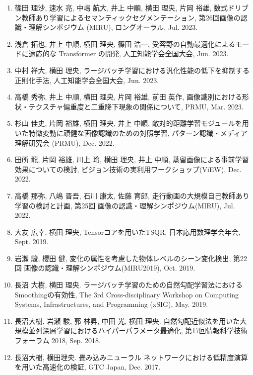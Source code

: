 \documentclass[margin,line]{cv}
\begin{document}
\begin{resume}
\begin{enumerate}
\item 篠田 理沙, 速水 亮, 中嶋 航大, 井上 中順, 横田 理央, 片岡 裕雄,  数式ドリブン教師あり学習によるセマンティックセグメンテーション, 第26回画像の認識・理解シンポジウム (MIRU), ロングオーラル, Jul. 2023.

\item 浅倉 拓也, 井上 中順, 横田 理央, 篠田 浩一, 受容野の自動最適化によるモードに適応的な Transformer の開発, 人工知能学会全国大会, Jun. 2023.

\item 中村 祥大, 横田 理央, ラージバッチ学習における汎化性能の低下を抑制する正則化手法, 人工知能学会全国大会, Jun. 2023.

\item 高橋 秀弥, 井上 中順, 横田 理央, 片岡 裕雄, 前田 英作, 画像識別における形状・テクスチャ偏重度と二重降下現象の関係について, PRMU, Mar. 2023.

\item 杉山 佳史, 片岡 裕雄, 横田 理央, 井上 中順, 敵対的距離学習モジュールを用いた特徴変動に頑健な画像認識のための対照学習, パターン認識・メディア理解研究会 (PRMU), Dec. 2022.

\item 田所 龍, 片岡 裕雄, 川上 玲, 横田 理央, 井上 中順, 蒸留画像による事前学習効果についての検討, ビジョン技術の実利用ワークショップ(ViEW), Dec. 2022.

\item 高橋 那弥, 八嶋 晋吾, 石川 康太, 佐藤 育郎, 走行動画の大規模自己教師あり学習の検討と計画, 第25回 画像の認識・理解シンポジウム(MIRU), Jul. 2022.

\item 大友 広幸, 横田 理央, Tensorコアを用いたTSQR, 日本応用数理学会年会, Sept. 2019.

\item 岩瀬 駿, 櫻田 健, 変化の属性を考慮した物体レベルのシーン変化検出, 第22回 画像の認識・理解シンポジウム(MIRU2019), Oct. 2019.

\item 長沼 大樹, 横田 理央. ラージバッチ学習のための自然勾配学習法におけるSmoothingの有効性, The 3rd Cross-disciplinary Workshop on Computing Systems, Infrastructures, and Programming (xSIG), May. 2019.

\item 長沼大樹, 岩瀬 駿, 郭 林昇, 中田 光, 横田 理央. 自然勾配近似法を用いた大規模並列深層学習におけるハイパーパラメータ最適化, 第17回情報科学技術フォーラム 2018, Sep. 2018.

\item 長沼大樹, 横田理央. 畳み込みニューラル ネットワークにおける低精度演算を用いた高速化の検証, GTC Japan, Dec. 2017.


\end{enumerate}
\end{resume}
\end{document}
